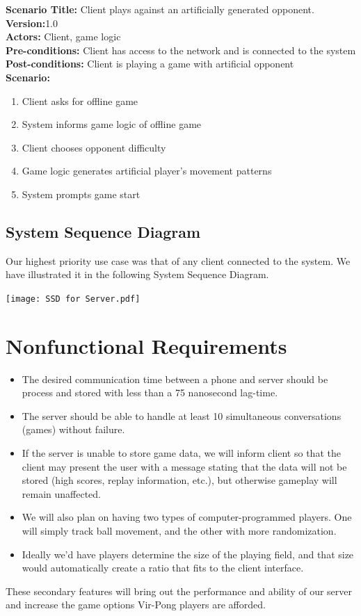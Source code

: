 \documentclass[letterpaper,12pt]{article}
\begin{document}
\noindent \textbf{Scenario Title:} Client plays against an artificially generated opponent.\\
\textbf{Version:}1.0\\
\textbf{Actors:} Client, game logic\\
\textbf{Pre-conditions:} Client has access to the network and is connected to the system\\
\textbf{Post-conditions:} Client is playing a game with artificial opponent\\
\textbf{Scenario:}
\begin{enumerate}
\item Client asks for offline game
\item System informs game logic of offline game
\item Client chooses opponent difficulty
\item Game logic generates artificial player's movement patterns
\item System prompts game start
\end{enumerate}


\subsection{System Sequence Diagram}
Our highest priority use case was that of any client connected to the system. We have illustrated it in the following System Sequence Diagram. 
\begin{center}\texttt{[image: SSD for Server.pdf]} \end{center} 
\section{Nonfunctional Requirements}
\begin{itemize}
\item The desired communication time between a phone and server should be process and stored with less than a 75 nanosecond lag-time.
\item The server should be able to handle at least 10 simultaneous conversations (games) without failure. 
\item If the server is unable to store game data, we will inform client so that the client may present the user with a message stating that the data will not be stored (high scores, replay information, etc.), but otherwise gameplay will remain unaffected. 
\item We will also plan on having two types of computer-programmed players. One will simply track ball movement, and the other with more randomization. 
\item Ideally we'd have players determine the size of the playing field, and that size would automatically create a ratio that fits to the client interface. 
\end{itemize}
These secondary features will bring out the performance and ability of our server and increase the game options Vir-Pong players are afforded. 
\end{document}
